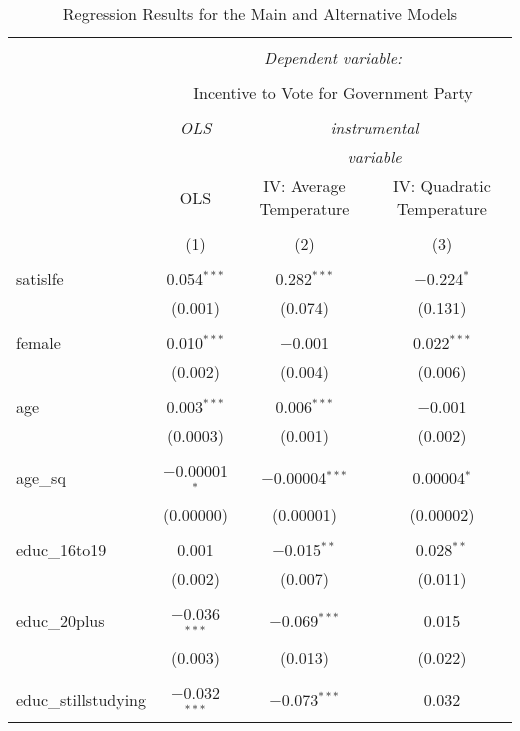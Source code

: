 
\begin{table}[!htbp] \centering 
  \caption{Regression Results for the Main and Alternative Models} 
  \label{} 
\begin{tabular}{@{\extracolsep{5pt}}lccc} 
\\[-1.8ex]\hline 
\hline \\[-1.8ex] 
 & \multicolumn{3}{c}{\textit{Dependent variable:}} \\ 
\cline{2-4} 
\\[-1.8ex] & \multicolumn{3}{c}{Incentive to Vote for Government Party} \\ 
\\[-1.8ex] & \textit{OLS} & \multicolumn{2}{c}{\textit{instrumental}} \\ 
 & \textit{} & \multicolumn{2}{c}{\textit{variable}} \\ 
 & OLS & IV: Average Temperature & IV: Quadratic Temperature \\ 
\\[-1.8ex] & (1) & (2) & (3)\\ 
\hline \\[-1.8ex] 
 satislfe & 0.054$^{***}$ & 0.282$^{***}$ & $-$0.224$^{*}$ \\ 
  & (0.001) & (0.074) & (0.131) \\ 
  & & & \\ 
 female & 0.010$^{***}$ & $-$0.001 & 0.022$^{***}$ \\ 
  & (0.002) & (0.004) & (0.006) \\ 
  & & & \\ 
 age & 0.003$^{***}$ & 0.006$^{***}$ & $-$0.001 \\ 
  & (0.0003) & (0.001) & (0.002) \\ 
  & & & \\ 
 age\_sq & $-$0.00001$^{*}$ & $-$0.00004$^{***}$ & 0.00004$^{*}$ \\ 
  & (0.00000) & (0.00001) & (0.00002) \\ 
  & & & \\ 
 educ\_16to19 & 0.001 & $-$0.015$^{**}$ & 0.028$^{**}$ \\ 
  & (0.002) & (0.007) & (0.011) \\ 
  & & & \\ 
 educ\_20plus & $-$0.036$^{***}$ & $-$0.069$^{***}$ & 0.015 \\ 
  & (0.003) & (0.013) & (0.022) \\ 
  & & & \\ 
 educ\_stillstudying & $-$0.032$^{***}$ & $-$0.073$^{***}$ & 0.032 \\ 

\end{tabular}
\end{table}
